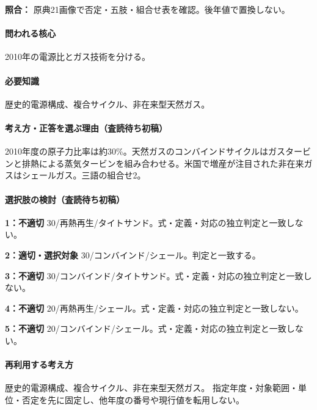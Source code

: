 \noindent\textbf{照合：} 原典21画像で否定・五肢・組合せ表を確認。後年値で置換しない。\par

\paragraph{問われる核心} 2010年の電源比とガス技術を分ける。

\paragraph{必要知識} 歴史的電源構成、複合サイクル、非在来型天然ガス。

\paragraph{考え方・正答を選ぶ理由（査読待ち初稿）} 2010年度の原子力比率は約30\%。天然ガスのコンバインドサイクルはガスタービンと排熱による蒸気タービンを組み合わせる。米国で増産が注目された非在来ガスはシェールガス。三語の組合せ2。

\paragraph{選択肢の検討（査読待ち初稿）}\mbox{}\par

\noindent\textbf{1：不適切} 30/再熱再生/タイトサンド。式・定義・対応の独立判定と一致しない。\par

\noindent\textbf{2：適切・選択対象} 30/コンバインド/シェール。判定と一致する。\par

\noindent\textbf{3：不適切} 30/コンバインド/タイトサンド。式・定義・対応の独立判定と一致しない。\par

\noindent\textbf{4：不適切} 20/再熱再生/シェール。式・定義・対応の独立判定と一致しない。\par

\noindent\textbf{5：不適切} 20/コンバインド/シェール。式・定義・対応の独立判定と一致しない。\par

\paragraph{再利用する考え方} 歴史的電源構成、複合サイクル、非在来型天然ガス。 指定年度・対象範囲・単位・否定を先に固定し、他年度の番号や現行値を転用しない。

